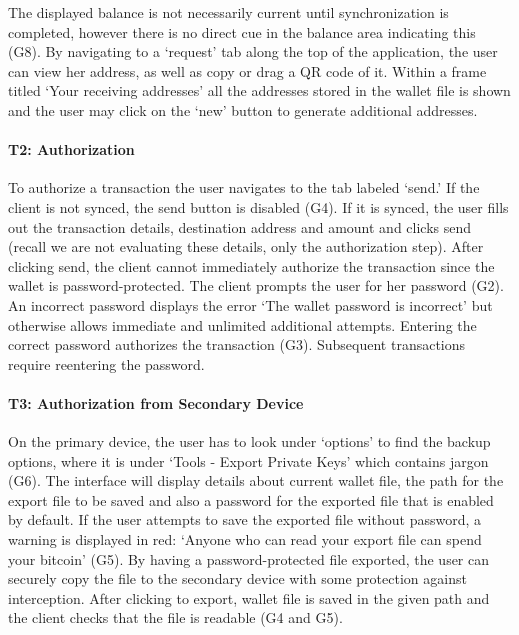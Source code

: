The displayed balance is not necessarily current until synchronization is completed, however there is no direct cue in the balance area indicating this (G8). By navigating to a `request' tab along the top of the application, the user can view her address, as well as copy or drag a QR code of it. Within a frame titled `Your receiving addresses' all the addresses stored in the wallet file is shown and the user may click on the `new' button to generate additional addresses. 

\paragraph{T2: Authorization}

To authorize a transaction the user navigates to the tab labeled `send.' If the client is not synced, the send button is disabled (G4). If it is synced, the user fills out the transaction details, destination address and amount and clicks send (recall we are not evaluating these details, only the authorization step). After clicking send, the client cannot immediately authorize the transaction since the wallet is password-protected. The client prompts the user for her password (G2). An incorrect password displays the error `The wallet password is incorrect' but otherwise allows immediate and unlimited additional attempts. Entering the correct password authorizes the transaction (G3). Subsequent transactions require reentering the password.


\paragraph{T3: Authorization from Secondary Device}

On the primary device, the user has to look under `options' to find the backup options, where it is under `Tools - Export Private Keys' which contains jargon (G6). The interface will display details about current wallet file, the path for the export file to be saved and also a password for the exported file that is enabled by default. If the user attempts to save the exported file without password, a warning is displayed in red: `Anyone who can read your export file can spend your bitcoin' (G5). By having a password-protected file exported, the user can securely copy the file to the secondary device with some protection against interception. After clicking to export, wallet file is saved in the given path and the client checks that the file is readable (G4 and G5). 

